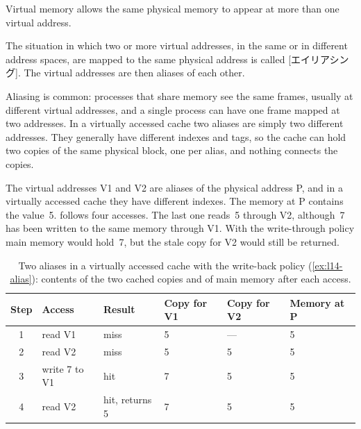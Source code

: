 \documentclass[../main.tex]{subfiles}
\begin{document}
Virtual memory allows the same physical memory to appear at more than one
virtual address.

\begin{definition}[Aliasing]
  The situation in which two or more virtual addresses, in the same or in
  different address spaces, are mapped to the same physical address is called
  [エイリアシング].  The virtual addresses are then aliases of
  each other.
\end{definition}

Aliasing is common: processes that share memory see the same frames, usually
at different virtual addresses, and a single process can have one frame
mapped at two addresses.  In a virtually accessed cache two aliases are
simply two different addresses.  They generally have different indexes and
tags, so the cache can hold two copies of the same physical block, one per
alias, and nothing connects the copies.

\begin{example}
  \label{ex:l14-alias}
  The virtual addresses V1 and V2 are aliases of the physical address P, and
  in a virtually accessed cache they have different indexes.  The memory at P
  contains the value~5.   follows four accesses.  The
  last one reads~5 through V2, although~7 has been written to the same
  memory through V1.  With the write-through policy main memory would
  hold~7, but the stale copy for V2 would still be returned.
\end{example}

\begin{table}[htbp]
  \centering\small
  \caption{Two aliases in a virtually accessed cache with the write-back
    policy (\cref{ex:l14-alias}): contents of the two cached copies and of
    main memory after each access.}
  \label{tab:l14-alias}
  \begin{tabular}{@{}clllll@{}}
    \toprule
    Step & Access          & Result          & Copy for V1 & Copy for V2 & Memory at P \\
    \midrule
    1    & read V1         & miss            & 5           & ---         & 5 \\
    2    & read V2         & miss            & 5           & 5           & 5 \\
    3    & write 7 to V1   & hit             & 7           & 5           & 5 \\
    4    & read V2         & hit, returns 5  & 7           & 5           & 5 \\
    \bottomrule
  \end{tabular}
\end{table}
\end{document}
